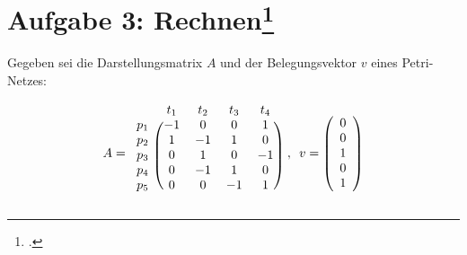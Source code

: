 \documentclass{lehramt-informatik-haupt}
\begin{document}
%

\section{Aufgabe 3: Rechnen\footcite[Seite 2]{sosy:ab:4}}

Gegeben sei die Darstellungsmatrix $A$ und der Belegungsvektor $v$ eines
Petri-Netzes:

\begin{displaymath}
A =
\begin{blockarray}{ccccc}
  & t_1 & t_2 & t_3 & t_4 \\
  \begin{block}{c(cccc)}
  p_1 & -1 & 0 & 0 & 1 \\
  p_2 & 1 & -1 & 1 & 0 \\
  p_3 & 0 & 1 & 0 & -1 \\
  p_4 & 0 & -1 & 1 & 0 \\
  p_5 & 0 & 0 & -1 & 1 \\
  \end{block}
\end{blockarray}
\enspace
,
\enspace
v =
\left(
  \begin{array}{c}
  0 \\
  0 \\
  1 \\
  0 \\
  1
  \end{array}
\right)
\end{displaymath}
\end{document}
